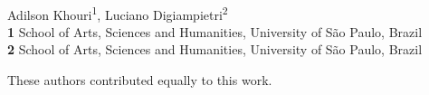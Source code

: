\documentclass[10pt,letterpaper]{article}
\date{}
\begin{document}
\vspace*{0.2in}

\begin{flushleft}
{\Large
\textbf{} %
}
\newline
\\
Adilson Khouri\textsuperscript{1\Yinyang},
Luciano Digiampietri\textsuperscript{2\Yinyang}
\\
\bigskip
\textbf{1} School of Arts, Sciences and Humanities, University of S\~{a}o Paulo, Brazil
\\
\textbf{2} School of Arts, Sciences and Humanities, University of S\~{a}o Paulo, Brazil
\\
\bigskip

% 
%
\Yinyang These authors contributed equally to this work.






\end{flushleft}
\end{document}
